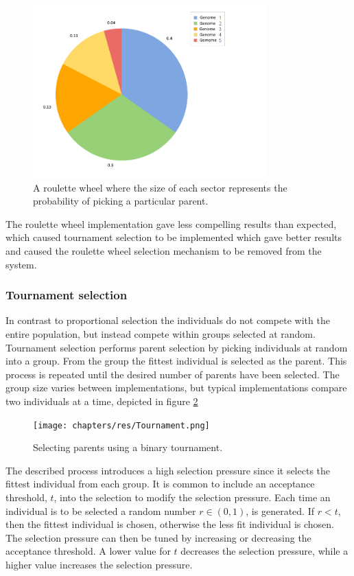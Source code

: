\begin{figure}[H]
	\centering
	\includegraphics[width=0.80\textwidth, clip]{chapters/res/roulette.png}
	\caption{A roulette wheel where the size of each sector represents the probability of picking a particular parent.}
	\label{fig:roulette}
\end{figure}

The roulette wheel implementation gave less compelling results than expected, which caused tournament selection to be implemented which gave better results and caused the roulette wheel selection mechanism to be removed from the system.
		
\subsubsection{Tournament selection}
In contrast to proportional selection the individuals do not compete with the entire population, but instead compete within groups selected at random.
Tournament selection performs parent selection by picking individuals at random into a group.
From the group the fittest individual is selected as the parent.
This process is repeated until the desired number of parents have been selected.
The group size varies between implementations, but typical implementations compare two\cite{goh_sexual_2003} individuals at a time, depicted in figure \ref{fig:tournament}
		
\begin{figure}[H]	
	\centering
	\texttt{[image: chapters/res/Tournament.png]}
	\caption{Selecting parents using a binary tournament.}
	\label{fig:tournament}
\end{figure}

The described process introduces a high selection pressure since it selects the fittest individual from each group.
It is common to include an acceptance threshold, $t$, into the selection to modify the selection pressure\cite{goh_sexual_2003}.
Each time an individual is to be selected a random number $r \in (0, 1)$, is generated.
If $r < t$, then the fittest individual is chosen, otherwise the less fit individual is chosen. The selection pressure can then be tuned by increasing or decreasing the acceptance threshold. A lower value for $t$ decreases the selection pressure, while a higher value increases the selection pressure.

